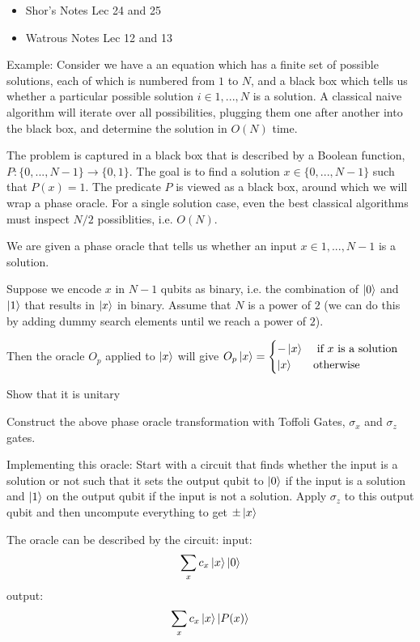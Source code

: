 \documentclass[12pt,twoside,fleqn]{report}
\theoremstyle{thmstyle}
\begin{document}
\begin{itemize}
    \item Shor's Notes Lec 24 and 25
    \item Watrous Notes Lec 12 and 13
\end{itemize}

Example: Consider we have a an equation which has a finite set of possible solutions, each of which is numbered from $1$ to $N$, and a black box which tells us whether a particular possible solution $i \in 1, ..., N$ is a solution. A classical naive algorithm will iterate over all possibilities, plugging them one after another into the black box, and determine the solution in $O(N)$ time.

The problem is captured in a black box that is described by a Boolean function, $P : \{ 0, ..., N-1 \} \to \{ 0, 1 \}$. The goal is to find a solution $x \in \{0, ..., N-1 \}$ such that $P(x) = 1$. 
The predicate $P$ is viewed as a black box, around which we will wrap a phase oracle. For a single solution case, even the best classical algorithms must inspect $N/2$ possiblities, i.e. $O(N)$.

We are given a phase oracle that tells us whether an input $x \in 1, ..., N-1$ is a solution.

Suppose we encode $x$ in $N-1$ qubits as binary, i.e. the combination of $\ket{0}$ and $\ket{1}$ that results in $\ket{x}$ in binary. Assume that $N$ is a power of $2$ (we can do this by adding dummy search elements until we reach a power of $2$).

Then the oracle $O_p$ applied to $\ket{x}$ will give $O_p \ket{x} = \begin{cases} -\ket{x} & \text{ if } x \text{ is a solution} \\ \ket{x} & \text{otherwise } \end{cases}$

Show that it is unitary

Construct the above phase oracle transformation with Toffoli Gates, $\sigma_x$ and $\sigma_z$ gates.

Implementing this oracle:
Start with a circuit that finds whether the input is a solution or not such that it sets the output qubit to $\ket{0}$ if the input is a solution and $\ket{1}$ on the output qubit if the input is not a solution. Apply $\sigma_z$ to this output qubit and then uncompute everything to get $\pm \ket{x}$

The oracle can be described by the circuit: 
input:
\[ \sum_x c_x \ket{x} \ket{0} \]
output: 
\[ \sum_x c_x \ket{x} \ket{P(x)} \]
\end{document}
